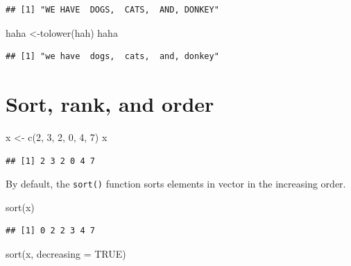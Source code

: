 \documentclass[
]{book}
\newenvironment{Shaded}{\begin{snugshade}}{\end{snugshade}}
\newcommand{\AttributeTok}[1]{\textcolor[rgb]{0.77,0.63,0.00}{#1}}
\newcommand{\ConstantTok}[1]{\textcolor[rgb]{0.00,0.00,0.00}{#1}}
\newcommand{\DecValTok}[1]{\textcolor[rgb]{0.00,0.00,0.81}{#1}}
\newcommand{\FunctionTok}[1]{\textcolor[rgb]{0.00,0.00,0.00}{#1}}
\newcommand{\NormalTok}[1]{#1}
\newcommand{\OtherTok}[1]{\textcolor[rgb]{0.56,0.35,0.01}{#1}}
\theoremstyle{definition}
\theoremstyle{definition}
\theoremstyle{definition}
\theoremstyle{definition}
\theoremstyle{remark}
\begin{document}
\begin{verbatim}
## [1] "WE HAVE  DOGS,  CATS,  AND, DONKEY"
\end{verbatim}

\begin{Shaded}
\begin{Highlighting}[]
\NormalTok{haha }\OtherTok{\textless{}{-}}\FunctionTok{tolower}\NormalTok{(hah) }
\NormalTok{haha}
\end{Highlighting}
\end{Shaded}

\begin{verbatim}
## [1] "we have  dogs,  cats,  and, donkey"
\end{verbatim}

\hypertarget{sort-rank-and-order}{%
\section{Sort, rank, and order}\label{sort-rank-and-order}}

\begin{Shaded}
\begin{Highlighting}[]
\NormalTok{x }\OtherTok{\textless{}{-}} \FunctionTok{c}\NormalTok{(}\DecValTok{2}\NormalTok{, }\DecValTok{3}\NormalTok{, }\DecValTok{2}\NormalTok{, }\DecValTok{0}\NormalTok{, }\DecValTok{4}\NormalTok{, }\DecValTok{7}\NormalTok{) }
\NormalTok{x }
\end{Highlighting}
\end{Shaded}

\begin{verbatim}
## [1] 2 3 2 0 4 7
\end{verbatim}

By default, the \texttt{sort()} function sorts elements in vector in the increasing order.

\begin{Shaded}
\begin{Highlighting}[]
\FunctionTok{sort}\NormalTok{(x)}
\end{Highlighting}
\end{Shaded}

\begin{verbatim}
## [1] 0 2 2 3 4 7
\end{verbatim}

\begin{Shaded}
\begin{Highlighting}[]
\FunctionTok{sort}\NormalTok{(x, }\AttributeTok{decreasing =} \ConstantTok{TRUE}\NormalTok{)}
\end{Highlighting}
\end{Shaded}
\end{document}
